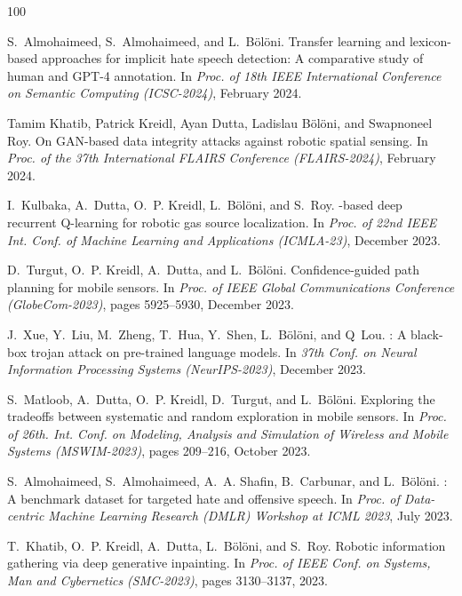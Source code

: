 \begin{thebibliography}{100}

S.~Almohaimeed, S.~Almohaimeed, and L.~Bölöni.
\newblock Transfer learning and lexicon-based approaches for implicit hate
  speech detection: A comparative study of human and {GPT-4} annotation.
\newblock In {\em Proc. of 18th IEEE International Conference on Semantic
  Computing (ICSC-2024)}, February 2024.

Tamim Khatib, Patrick Kreidl, Ayan Dutta, Ladislau Bölöni, and Swapnoneel
  Roy.
\newblock On {GAN}-based data integrity attacks against robotic spatial
  sensing.
\newblock In {\em Proc. of the 37th International FLAIRS Conference
  (FLAIRS-2024)}, February 2024.

I.~Kulbaka, A.~Dutta, O.~P. Kreidl, L.~B{\"o}l{\"o}ni, and S.~Roy.
-based deep recurrent {Q}-learning for robotic gas source
  localization.
\newblock In {\em Proc. of 22nd IEEE Int. Conf. of Machine Learning and
  Applications (ICMLA-23)}, December 2023.

D.~Turgut, O.~P. Kreidl, A.~Dutta, and L.~Bölöni.
\newblock Confidence-guided path planning for mobile sensors.
\newblock In {\em Proc. of IEEE Global Communications Conference
  (GlobeCom-2023)}, pages 5925--5930, December 2023.

J.~Xue, Y.~Liu, M.~Zheng, T.~Hua, Y.~Shen, L.~Bölöni, and Q~Lou.
: A black-box trojan attack on pre-trained language
  models.
\newblock In {\em 37th Conf. on Neural Information Processing Systems
  (NeurIPS-2023)}, December 2023.

S.~Matloob, A.~Dutta, O.~P. Kreidl, D.~Turgut, and L.~Bölöni.
\newblock Exploring the tradeoffs between systematic and random exploration in
  mobile sensors.
\newblock In {\em Proc. of 26th. Int. Conf. on Modeling, Analysis and
  Simulation of Wireless and Mobile Systems (MSWIM-2023)}, pages 209--216,
  October 2023.

S.~Almohaimeed, S.~Almohaimeed, A.~A. Shafin, B.~Carbunar, and L.~Bölöni.
: A benchmark dataset for targeted hate and offensive speech.
\newblock In {\em Proc. of Data-centric Machine Learning Research (DMLR)
  Workshop at ICML 2023}, July 2023.

T.~Khatib, O.~P. Kreidl, A.~Dutta, L.~B{\"o}l{\"o}ni, and S.~Roy.
\newblock Robotic information gathering via deep generative inpainting.
\newblock In {\em Proc. of IEEE Conf. on Systems, Man and Cybernetics
  (SMC-2023)}, pages 3130--3137, 2023.


\end{thebibliography}
